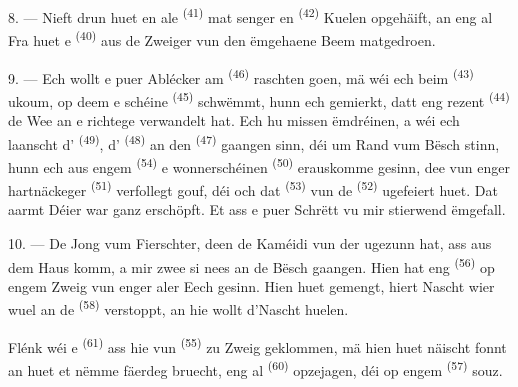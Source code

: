 8. --- Nieft drun huet en ale  \textsuperscript{(41)} mat senger
 en  \textsuperscript{(42)} Kuelen opgehäift, an eng al
Fra huet e  \textsuperscript{(40)}  aus de
Zweiger vun den ëmgehaene Beem matgedroen.

\VUsaut{3.0mm}
\VUsaut{3.0mm}

9. --- Ech wollt e puer Ablécker am  \textsuperscript{(46)}
raschten goen, mä wéi ech beim  \textsuperscript{(43)} ukoum, op deem e
schéine  \textsuperscript{(45)} schwëmmt, hunn ech gemierkt, datt eng
rezent  \textsuperscript{(44)} de Wee an e richtege
 verwandelt hat. Ech hu missen ëmdréinen, a wéi ech laanscht d'
\textsuperscript{(49)}, d' \textsuperscript{(48)} an den
 \textsuperscript{(47)} gaangen sinn, déi um Rand vum Bësch stinn, hunn
ech aus engem  \textsuperscript{(54)} e wonnerschéinen
 \textsuperscript{(50)} erauskomme gesinn, dee vun enger hartnäckeger
 \textsuperscript{(51)} verfollegt gouf, déi och dat
 \textsuperscript{(53)} vun de  \textsuperscript{(52)}
ugefeiert huet. Dat aarmt Déier war ganz erschöpft. Et ass e puer Schrëtt vu mir
stierwend ëmgefall.

10. --- De Jong vum Fierschter, deen de Kaméidi vun der 
ugezunn hat, ass aus dem Haus komm, a mir zwee si nees an de Bësch gaangen. Hien hat
eng  \textsuperscript{(56)} op engem Zweig vun enger aler Eech gesinn.
Hien huet gemengt, hiert Nascht wier wuel an de 
\textsuperscript{(58)} verstoppt, an hie wollt d'Nascht huelen.

Flénk wéi e  \textsuperscript{(61)} ass hie vun
 \textsuperscript{(55)} zu Zweig geklommen, mä hien huet näischt fonnt
an huet et nëmme fäerdeg bruecht, eng al  \textsuperscript{(60)}
opzejagen, déi op engem  \textsuperscript{(57)} souz.

\VUsaut{4.0mm}
\VUfilet{22mm}
